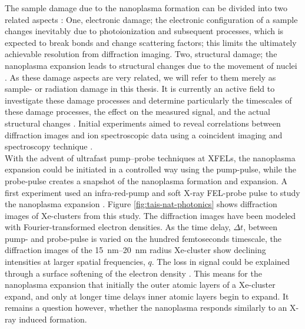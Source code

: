 The sample damage due to the nanoplasma formation can be divided into two related aspects \cite{Quiney-2010-NatPhys,Curwood-2013-PRA}: One, electronic damage; the electronic configuration of a sample changes inevitably due to photoionization and subsequent processes, which is expected to break bonds and change scattering factors; this limits the ultimately achievable resolution from diffraction imaging. Two, structural damage; the nanoplasma expansion leads to structural changes due to the movement of nuclei \citep{Neutze-2000-Nature}. As these damage aspects are very related, we will refer to them merely as sample- or radiation damage in this thesis. It is currently an active field to investigate these damage processes and determine particularly the timescales of these damage processes, the effect on the measured signal, and the actual structural changes \citep{Bostedt-2012-PRL}. Initial experiments aimed to reveal correlations between diffraction images and ion spectroscopic data using a coincident imaging and spectroscopy technique \citep{Gorkhover-2012-PRL,Rupp-2016-PRL}.\\[1\baselineskip]
%
With the advent of ultrafast pump--probe techniques at XFELs, the nanoplasma expansion could be initiated in a controlled way using the pump-pulse, while the probe-pulse creates a snapshot of the nanoplasma formation and expansion. A first experiment used an infra-red-pump and soft X-ray FEL-probe pulse to study the nanoplasma expansion \citep{Gorkhover-2016-NatPho,Schorb-2012-APL}. Figure \ref{fig:tais-nat-photonics} shows diffraction images of Xe-clusters from this study. The diffraction images have been modeled with Fourier-transformed electron densities. As the time delay, $\Delta t$, between pump- and probe-pulse is varied on the hundred femtoseconds timescale, the diffraction images of the \SIrange{15}{20}{\nano\meter} radius Xe-cluster show declining intensities at larger spatial frequencies, $q$. The loss in signal could be explained through a surface softening of the electron density \citep{Hau-Riege-2008-PRE,Peltz-2014-PRL}. This means for the nanoplasma expansion that initially the outer atomic layers of a Xe-cluster expand, and only at longer time delays inner atomic layers begin to expand. It remains a question however, whether the nanoplasma responds similarly to an X-ray induced formation.\\[1\baselineskip]
